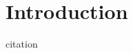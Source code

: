 \documentclass[../main/main.tex]{subfiles}
\begin{document}
\chapter*{Introduction}%
\label{sec:introduction}

\blindtext{}
citation~\cite{Amendola2017}
\end{document}
